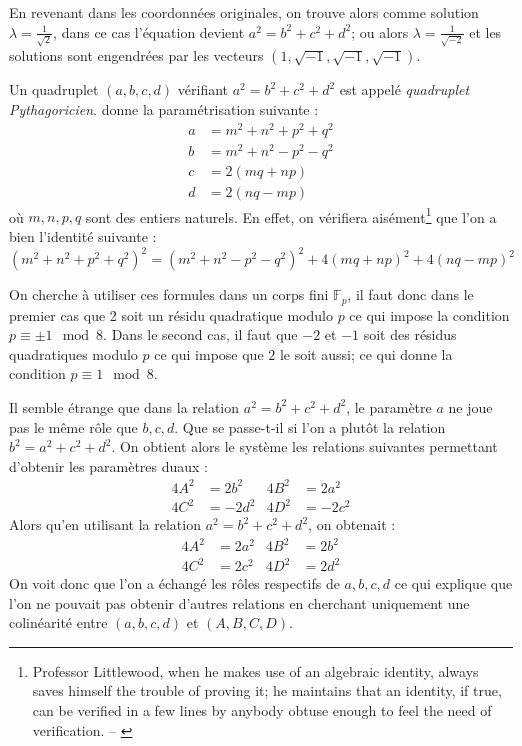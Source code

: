 \documentclass[a4paper]{article}
\theoremstyle{definition}
\theoremstyle{remark}
\numberwithin{equation}{section}
\begin{document}
En revenant dans les coordonnées originales, on trouve alors comme solution $\lambda = \frac{1}{\sqrt 2}$, dans ce cas l'équation devient $a^2 = b^2 + c^2 + d^2$; ou alors $\lambda = \frac{1}{\sqrt{-2}}$ et les solutions sont engendrées par les vecteurs $(1,\sqrt{-1},\sqrt{-1},\sqrt{-1})$.

Un quadruplet $(a,b,c,d)$ vérifiant $a^2 = b^2 + c^2 + d^2$ est appelé \emph{quadruplet Pythagoricien}. \citet{mordell} donne la paramétrisation suivante :
\begin{align*}
a &= m^2 + n^2 + p^2 + q^2 \\
b &= m^2 + n^2 - p^2 - q^2 \\
c &= 2(mq+np) \\
d &= 2(nq-mp)
\end{align*}
où $m,n,p,q$ sont des entiers naturels. En effet, on vérifiera aisément\footnote{Professor Littlewood, when he makes use of an algebraic identity, always saves himself the trouble of proving it;
he maintains that an identity, if true, can be verified in a few
lines by anybody obtuse enough to feel the need of verification. -- \citet{dyson}} que l'on a bien l'identité suivante :
$$(m^2 + n^2 + p^2 + q^2)^2 = (m^2 + n^2 - p^2 - q^2)^2 + 4(mq+np)^2 + 4(nq-mp)^2$$

On cherche à utiliser ces formules dans un corps fini $\mathbb{F}_p$, il faut donc dans le premier cas que 2 soit un résidu quadratique modulo $p$ ce qui impose la condition $p \equiv \pm 1 \mod{8}$. Dans le second cas, il faut que $-2$ et $-1$ soit des résidus quadratiques modulo $p$ ce qui impose que $2$ le soit aussi; ce qui donne la condition $p \equiv 1 \mod{8}$.

Il semble étrange que dans la relation $a^2 = b^2 + c^2 + d^2$, le paramètre $a$ ne joue pas le même rôle que $b,c,d$. Que se passe-t-il si l'on a plutôt la relation $b^2 = a^2 + c^2 + d^2$. On obtient alors le système les relations suivantes permettant d'obtenir les paramètres duaux :
\begin{align*}
4A^2 &= 2b^2  &4B^2 &= 2a^2 \\
4C^2 &= -2d^2  &4D^2 &= -2c^2
\end{align*}
Alors qu'en utilisant la relation $a^2 = b^2 + c^2 + d^2$, on obtenait :
\begin{align*}
4A^2 &= 2a^2  &4B^2 &= 2b^2 \\
4C^2 &= 2c^2  &4D^2 &= 2d^2
\end{align*}
On voit donc que l'on a échangé les rôles respectifs de $a,b,c,d$ ce qui explique que l'on ne pouvait pas obtenir d'autres relations en cherchant uniquement une colinéarité entre $(a,b,c,d)$ et $(A,B,C,D)$.
\end{document}

